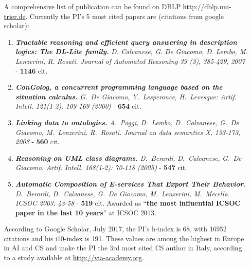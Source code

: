 A comprehensive list of publication can be found on DBLP \url{http://dblp.uni-trier.de}.
Currently the PI's 5 most cited papers are (citations from google scholar):
\begin{enumerate}[topsep=0pt,itemsep=-1ex,partopsep=1ex,parsep=1ex]
\item 
\textit{\textbf{Tractable reasoning and efficient query answering in description logics: The DL-Lite family.} D. Calvanese, G. De Giacomo, D. Lembo, M. Lenzerini, R. Rosati.  Journal of Automated Reasoning 39 (3), 385-429, 2007} - \textbf{1146} cit. %

\item 
\textit{\textbf{ConGolog, a concurrent programming language based on the situation calculus.} G.\ De Giacomo, Y.\ Lesperance, H.\ Levesque: Artif. Intell. 121(1-2): 109-169 (2000)} -  \textbf{654} cit. %


\item 
\textit{\textbf{Linking data to ontologies.}
A.\ Poggi, D.\ Lembo, D.\ Calvanese, G.\ De Giacomo, M.\ Lenzerini, R.\ Rosati.
Journal on data semantics X, 133-173, 2008} - \textbf{560} cit. %


\item 
\textit{\textbf{Reasoning on UML class diagrams.} D.\ Berardi, D.\ Calvanese, G.\ De Giacomo. Artif. Intell. 168(1-2): 70-118 (2005)} - \textbf{547} cit. %

\item 
\textit{\textbf{Automatic Composition of E-services That Export Their Behavior.} D.\ Berardi, D.\ Calvanese, G.\ De Giacomo, M.\ Lenzerini, M.\ Mecella. ICSOC 2003: 43-58} - \textbf{519} cit. Awarded as ``\textbf{the most influential ICSOC paper in the last 10 years}'' at ICSOC 2013.

\end{enumerate}
According to Google Scholar, July 2017, the PI's h-index is 68, with 16952 citations and his i10-index is 191. These values are among the highest in Europe in AI and CS and make the PI the 3rd most cited CS author in Italy, according to a study available at \url{http://via-academy.org}. 

